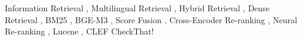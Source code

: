 \documentclass{ceurart}
\begin{document}
\begin{keywords}
  Information Retrieval \sep
  Multilingual Retrieval \sep
  Hybrid Retrieval \sep
  Dense Retrieval \sep
  BM25 \sep
  BGE-M3 \sep
  Score Fusion \sep
  Cross-Encoder Re-ranking \sep
  Neural Re-ranking \sep
  Lucene \sep
  CLEF CheckThat!
\end{keywords}

\maketitle





















\end{document}
